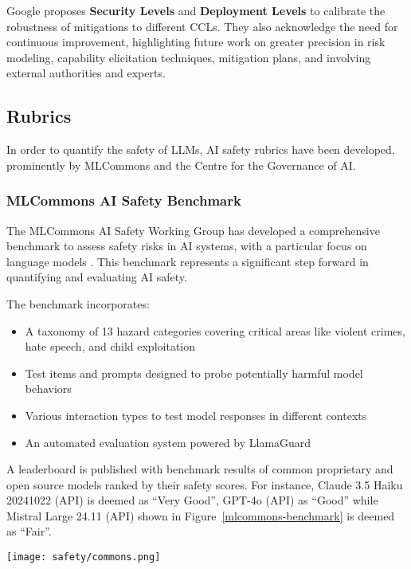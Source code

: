 Google proposes \textbf{Security Levels} and \textbf{Deployment Levels} to calibrate the robustness of mitigations to different CCLs. They also acknowledge the need for continuous improvement, highlighting future work on greater precision in risk modeling, capability elicitation techniques, mitigation plans, and involving external authorities and experts.

\subsection{Rubrics}

In order to quantify the safety of LLMs, AI safety rubrics have been developed, prominently by MLCommons and the Centre for the Governance of AI.

\subsubsection{MLCommons AI Safety Benchmark}

The MLCommons AI Safety Working Group has developed a comprehensive benchmark to assess safety risks in AI systems, with a particular focus on language models . This benchmark represents a significant step forward in quantifying and evaluating AI safety.

The benchmark incorporates:

\begin{itemize}
    \item A taxonomy of 13 hazard categories covering critical areas like violent crimes, hate speech, and child exploitation
    \item Test items and prompts designed to probe potentially harmful model behaviors
    \item Various interaction types to test model responses in different contexts
    \item An automated evaluation system powered by LlamaGuard 
\end{itemize}

A leaderboard  is published with benchmark results of common proprietary and open source models ranked by their safety scores. For instance, Claude 3.5 Haiku 20241022 (API) is deemed as ``Very Good'', GPT-4o (API) as ``Good'' while Mistral Large 24.11 (API) shown in Figure~\ref{mlcommons-benchmark} is deemed as ``Fair''.

\begin{figure*}[h!]
\centering
\texttt{[image: safety/commons.png]}
\caption{MLCommons AI Safety Benchmark Results for Mistral Large 24.11 (API) \cite{vidgen2024introducingv05aisafety}.}
\label{mlcommons-benchmark}
\end{figure*}

